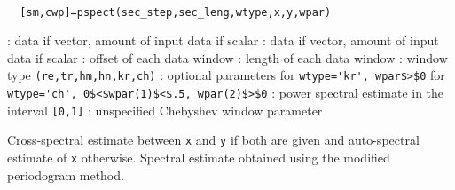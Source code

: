 
\begin{mandesc}
   \\ %
\end{mandesc}
\begin{calling_sequence}
\begin{verbatim}
  [sm,cwp]=pspect(sec_step,sec_leng,wtype,x,y,wpar)  
\end{verbatim}
\end{calling_sequence}
\begin{parameters}
  \begin{varlist}
    : data if vector, amount of input data if scalar
    : data if vector, amount of input data if scalar
    : offset of each data window
    : length of each data window
    : window type \verb!(re,tr,hm,hn,kr,ch)!
    : optional parameters  for \verb!wtype='kr', wpar$>$0!  for \verb!wtype='ch', 0$<$wpar(1)$<$.5, wpar(2)$>$0!
    : power spectral estimate in the interval \verb![0,1]!
    : unspecified Chebyshev window parameter
  \end{varlist}
\end{parameters}
\begin{mandescription}
  Cross-spectral estimate between \verb!x! and \verb!y! if both are given
  and auto-spectral estimate of \verb!x! otherwise.
  Spectral estimate obtained using the modified periodogram method.
\end{mandescription}
